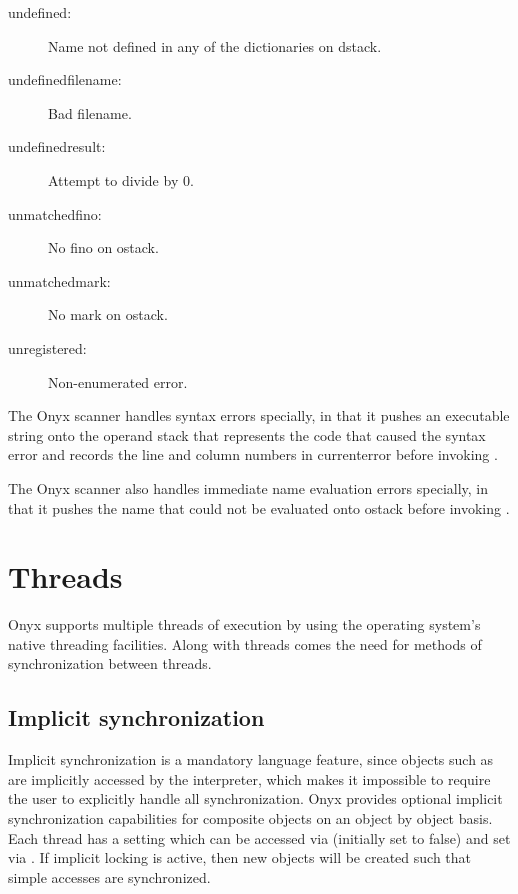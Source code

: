 \begin{description}
\label{undefined}
\item[undefined: ] Name not defined in any of the dictionaries on dstack.
\label{undefinedfilename}
\item[undefinedfilename: ] Bad filename.
\label{undefinedresult}
\item[undefinedresult: ] Attempt to divide by 0.
\label{unmatchedfino}
\item[unmatchedfino: ] No fino on ostack.
\label{unmatchedmark}
\item[unmatchedmark: ] No mark on ostack.
\label{unregistered}
\item[unregistered: ] Non-enumerated error.
\end{description}

The Onyx scanner handles syntax errors specially, in that it pushes an
executable string onto the operand stack that represents the code that caused
the syntax error and records the line and column numbers in currenterror before
invoking .

The Onyx scanner also handles immediate name evaluation errors specially, in
that it pushes the name that could not be evaluated onto ostack before invoking
.

\section{Threads}

Onyx supports multiple threads of execution by using the operating system's
native threading facilities.  Along with threads comes the need for methods of
synchronization between threads.

\subsection{Implicit synchronization}
\label{sec:onyx_implicit_synchronization}

Implicit synchronization is a mandatory language feature, since objects such as
 are implicitly accessed by the
interpreter, which makes it impossible to require the user to explicitly handle
all synchronization.  Onyx provides optional implicit synchronization
capabilities for composite objects on an object by object basis.  Each thread
has a setting which can be accessed via
 (initially set
to false) and set via .
If implicit locking is active, then new objects will be created such that simple
accesses are synchronized.

